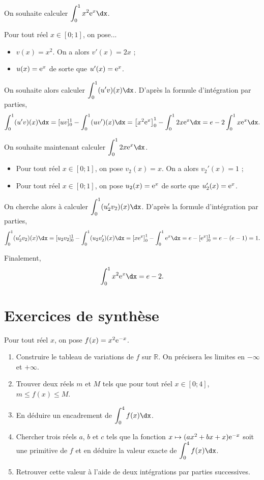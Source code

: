 \documentclass[11pt,fleqn, openany]{book} %
\begin{document}
\begin{solution}
On souhaite calculer \(\displaystyle\int_0^1x^2\e^x\dx\).

Pour tout réel \(x\in[0;1]\), on pose...
\begin{itemize}
\item  \(v(x)=x^2\). On a alors \(v'(x)=2x\) ;
\item  \(u(x)=\mathrm{e}^x\) de sorte que \(u'(x)=\mathrm{e}^x\).
\end{itemize}

On souhaite alors calculer \(\displaystyle\int_{0}^1 (u'v)(x)\dx\). D'après la formule d'intégration par parties,
\[ \displaystyle\int_{0}^1 (u'v)(x)\dx = [uv]_0^1 - \displaystyle\int_{0}^1 (uv')(x)\dx=\left[x^2\e^x\right]_0^1-\displaystyle\int_{0}^12x\e^x\dx=e-2\displaystyle\int_{0}^1x\e^x\dx.\]

On souhaite maintenant calculer \(\displaystyle\int_{0}^12x\e^x\dx\).

\begin{itemize}
\item  Pour tout réel \(x\in[0;1]\), on pose \(v_2(x)=x\). On a alors \(v_2'(x)=1\) ;
\item  Pour tout réel \(x\in[0;1]\), on pose \(u_2(x)=\mathrm{e}^x\) de sorte que \(u_2'(x)=\mathrm{e}^x\).
\end{itemize}

On cherche alors à calculer \(\displaystyle\int_{0}^1 (u_2'v_2)(x)\dx\). D'après la formule d'intégration par parties,
\[\displaystyle\int_{0}^1 (u_2'v_2)(x)\dx=[u_2v_2]_0^1-\displaystyle\int_{0}^1 (u_2v_2')(x)\dx = \left[x\e^x\right]_0^1-\displaystyle\int_{0}^1 \e^x \dx=e-[\e^x]_0^1=e-(e-1)=1 .\]

Finalement,
\[\displaystyle\int_0^1x^2\e^x\dx=e-2.\]\end{solution}




\section*{Exercices de synthèse}

\begin{exercise}[topic=int04]Pour tout réel $x$, on pose $f(x)=x^2\mathrm{e}^{-x}$.
\begin{enumerate}
\item Construire le tableau de variations de $f$ sur $\mathbb{R}$. On précisera les limites en $-\infty$ et $+\infty$.
\item Trouver deux réels $m$ et $M$ tels que pour tout réel $x\in [0;4]$, $m \leqslant f(x) \leqslant M$.
\item En déduire un encadrement de $\displaystyle \int _0^4 f(x)\dx$.
\item Chercher trois réels $a$, $b$ et $c$ tels que la fonction $x\mapsto (ax^2+bx+x)\mathrm{e}^{-x}$ soit une primitive de $f$ et en déduire la valeur exacte de $\displaystyle \int _0^4 f(x)\dx$.
\item Retrouver cette valeur à l'aide de deux intégrations par parties successives.
\end{enumerate}\end{exercise}
\end{document}
